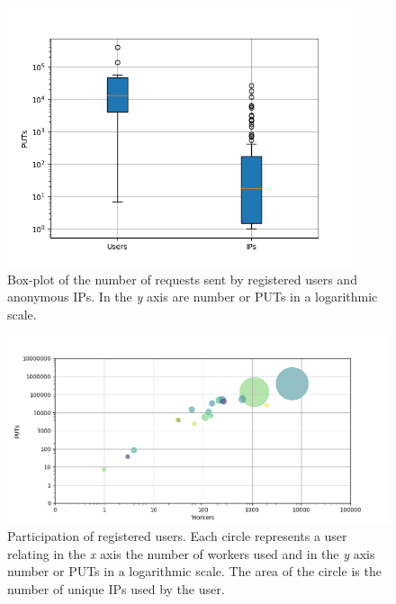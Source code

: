 \documentclass{llncs}
\begin{document}
\begin{figure}[htbp]
    \centering
        \includegraphics[width=4in]{img/puts_box.png}
    \caption{ Box-plot of the number of requests sent by registered users and anonymous IPs.
     In the \emph{y} axis are number or PUTs in a logarithmic scale.
    }
    \label{fig:box}
\end{figure}
%
\begin{figure}[htbp]
    \centering
        \includegraphics[width=5in]{img/workers_put_ip.png}
    \caption{ Participation of registered users. Each circle represents a user relating  
        in the \emph{x} axis the number of workers used and in the \emph{y} axis 
        number or PUTs in a logarithmic scale. The area of the circle is the number 
        of unique IPs used by the user.
    }
    \label{fig:worker-put-ips}
\end{figure}
%
\end{document}
